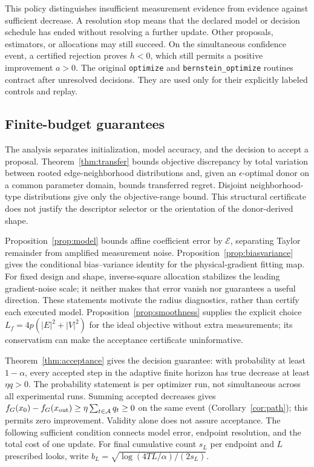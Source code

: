 \documentclass[11pt]{article}
\begin{document}
This policy distinguishes insufficient measurement evidence from evidence
against sufficient decrease. A resolution stop means that the declared
model or decision schedule has ended without resolving a further update.
Other proposals, estimators, or allocations may still succeed. On the
simultaneous confidence event, a certified
rejection proves $h<0$, which still permits a positive improvement $a>0$.
The original \texttt{optimize} and \texttt{bernstein\_optimize} routines
contract after unresolved decisions. They are
used only for their explicitly labeled controls and replay.


\subsection{Finite-budget guarantees}
The analysis separates initialization, model accuracy, and the decision to
accept a proposal. Theorem~\ref{thm:transfer} bounds objective discrepancy
by total variation between rooted edge-neighborhood distributions and,
given an $\epsilon$-optimal donor on a common parameter domain, bounds
transferred regret. Disjoint neighborhood-type distributions give only the
objective-range bound. This structural certificate does not justify the
descriptor selector or the orientation of the donor-derived shape.

Proposition~\ref{prop:model} bounds affine coefficient error by
$\mathcal E$, separating Taylor remainder from amplified measurement noise.
Proposition~\ref{prop:biasvariance} gives the conditional bias--variance
identity for the physical-gradient fitting map. For fixed design and shape,
inverse-square allocation stabilizes the leading gradient-noise scale;
it neither makes that error vanish nor guarantees a useful direction.
These statements motivate the radius diagnostics, rather than certify
each executed model. Proposition~\ref{prop:smoothness} supplies the explicit
choice $L_f=4p(|E|^2+|V|^2)$ for the ideal objective without extra
measurements; its conservatism can make the acceptance certificate uninformative.

Theorem~\ref{thm:acceptance} gives the decision guarantee: with probability
at least $1-\alpha$, every accepted step in the adaptive finite horizon
has true decrease at least $\eta q>0$. The probability statement is
per optimizer run, not simultaneous across all experimental runs. Summing
accepted decreases gives $f_G(x_0)-f_G(x_{\rm out})\ge
\eta\sum_{t\in\mathcal A}q_t\ge0$ on the same event
(Corollary~\ref{cor:path}); this permits zero improvement. Validity alone
does not assure acceptance. The following sufficient condition connects model error,
endpoint resolution, and the total cost of one update. For final cumulative
count $s_L$ per endpoint and $L$ prescribed looks, write
$b_L=\sqrt{\log(4TL/\alpha)/(2s_L)}$.
\end{document}
